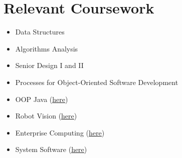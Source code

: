 \documentclass[letterpaper,11pt]{article}
\newcommand{\resumeSubHeadingListStart}{\begin{itemize}[leftmargin=0.0in, label={}]}
\newcommand{\resumeSubHeadingListEnd}{\end{itemize}}
\begin{document}
\section{Relevant Coursework}
        \begin{multicols}{3}
            \begin{itemize}[itemsep=-5pt, parsep=3pt]
                \item Data Structures
                \item Algorithms Analysis
                \item Senior Design I and II
                \item Processes for Object-Oriented Software Development
                \item OOP Java (\underline{\href{https://github.com/Asere231/Java_OOP}{here}})
                \item Robot Vision (\underline{\href{https://github.com/Asere231/Robot-Vision}{here}})
                \item Enterprise Computing (\underline{\href{https://github.com/Asere231/Enterprise-Computing}{here}})
                \item System Software (\underline{\href{https://github.com/Asere231/PL-0-Compiler}{here}})
            \end{itemize}
        \end{multicols}
        \vspace*{2.0\multicolsep}

\end{document}
